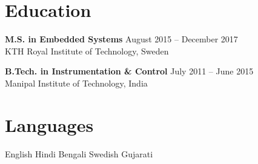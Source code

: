 \documentclass[10pt,a4paper]{article}
\begin{document}
\section{Education}
\textbf{M.S. in Embedded Systems} \hfill August 2015 -- December 2017\\
KTH Royal Institute of Technology, Sweden\par\vspace{4pt}
\textbf{B.Tech. in Instrumentation \& Control} \hfill July 2011 -- June 2015\\
Manipal Institute of Technology, India
\section{Languages}
English \quad Hindi \quad Bengali \quad Swedish \quad Gujarati
\end{document}
